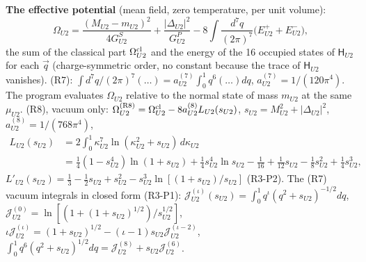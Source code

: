 \documentclass[
  10pt,
]{article}
\begin{document}
\textbf{The effective potential} (mean field, zero temperature, per unit
volume):
\[\Omega_{U2}=\frac{(M_{U2}-m_{U2})^2}{4G^S_{U2}}+\frac{\lvert\Delta_{U2}\rvert^2}{G^P_{U2}}-8\int\frac{d^7q}{(2\pi)^7}\big(E^+_{U2}+E^-_{U2}\big),\]
the sum of the classical part \(\Omega^{\rm cl}_{U2}\) and the energy of
the 16 occupied states of \(\mathsf H_{U2}\) for each \(\vec q\)
(charge-symmetric order, no constant because the trace of
\(\mathsf H_{U2}\) vanishes). (R7):
\(\int d^7q/(2\pi)^7(\dots)=a^{(7)}_{U2}\int_0^1q^6(\dots)dq\),
\(a^{(7)}_{U2}=1/(120\pi^4)\). The program evaluates \(\Omega_{U2}\)
relative to the normal state of mass \(m_{U2}\) at the same
\(\mu_{U2}\). (R8), vacuum only:
\(\Omega^{\rm (R8)}_{U2}=\Omega^{\rm cl}_{U2}-8a^{(8)}_{U2}L_{U2}(s_{U2})\),
\(s_{U2}=M^2_{U2}+\lvert\Delta_{U2}\rvert^2\),
\(a^{(8)}_{U2}=1/(768\pi^4)\),
\[\begin{aligned}L_{U2}(s_{U2})&=2\int_0^1\kappa^7_{U2}\ln(\kappa^2_{U2}+s_{U2})\,d\kappa_{U2}\\&=\tfrac14(1-s^4_{U2})\ln(1+s_{U2})+\tfrac14s^4_{U2}\ln s_{U2}-\tfrac1{16}+\tfrac1{12}s_{U2}-\tfrac18s^2_{U2}+\tfrac14s^3_{U2},\end{aligned}\]
\(L'_{U2}(s_{U2})=\tfrac13-\tfrac12s_{U2}+s^2_{U2}-s^3_{U2}\ln[(1+s_{U2})/s_{U2}]\)
(R3-P2). The (R7) vacuum integrals in closed form (R3-P1):
\(\mathcal J^{(\iota)}_{U2}(s_{U2})=\int_0^1q^\iota(q^2+s_{U2})^{-1/2}dq\),
\(\mathcal J^{(0)}_{U2}=\ln[(1+(1+s_{U2})^{1/2})/s^{1/2}_{U2}]\),
\(\iota\mathcal J^{(\iota)}_{U2}=(1+s_{U2})^{1/2}-(\iota-1)s_{U2}\mathcal J^{(\iota-2)}_{U2}\),
\(\int_0^1q^6(q^2+s_{U2})^{1/2}dq=\mathcal J^{(8)}_{U2}+s_{U2}\mathcal J^{(6)}_{U2}\).
\end{document}
